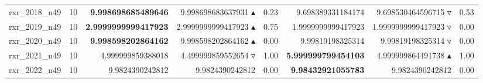 \begin{table}[]
{\begin{tabular}{ll@{\hspace{1.2cm}}rrr@{\hspace{1.2cm}}rrr}
rxr_2018_n49 & 10 & \textbf{9.998698685489646} & 9.998698683637931 $\blacktriangle$ & 0.23 & 9.698389331184174 & 9.698530464596715 $\triangledown$ & 0.53 \\
rxr_2019_n49 & 10 & \textbf{2.9999999999417923} & 2.9999999999417923 $\blacktriangle$ & 0.75 & 1.9999999999417923 & 1.9999999999417923 $\triangledown$ & 0.00 \\
rxr_2020_n49 & 10 & \textbf{9.998598202864162} & 9.998598202864162 $\blacktriangle$ & 0.00 & 9.99819198325314 & 9.99819198325314 $\triangledown$ & 0.00 \\
rxr_2021_n49 & 10 & 4.999999859388018 & 4.499999859552654 $\triangledown$ & 1.00 & \textbf{5.999999799454103} & 4.999999864491738 $\blacktriangle$ & 1.00 \\
rxr_2022_n49 & 10 & 9.9824390242812 & 9.9824390242812 \phantom{$\blacktriangle$} & 0.00 & \textbf{9.98432921055783} & 9.9824390242812 \phantom{$\blacktriangle$} & 0.00 \\
\bottomrule
    \end{tabular}
    }
\end{table}
